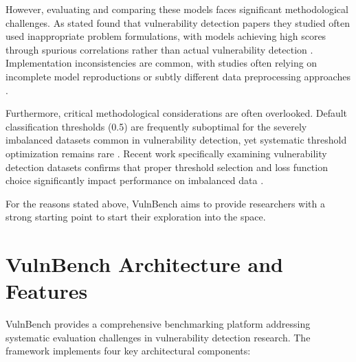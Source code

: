 \documentclass[letterpaper]{article}
\begin{document}
However, evaluating and comparing these models faces significant methodological challenges. As stated \cite{risse2025top} found that vulnerability detection papers they studied often used inappropriate problem formulations, with models achieving high scores through spurious correlations rather than actual vulnerability detection \citep{risse2025top}. Implementation inconsistencies are common, with studies often relying on incomplete model reproductions or subtly different data preprocessing approaches \citep{codecse2024}.

Furthermore, critical methodological considerations are often overlooked. Default classification thresholds (0.5) are frequently suboptimal for the severely imbalanced datasets common in vulnerability detection, yet systematic threshold optimization remains rare \citep{ghost2021, leevy2023optimal}. Recent work specifically examining vulnerability detection datasets confirms that proper threshold selection and loss function choice significantly impact performance on imbalanced data \citep{he2025imbalance}.

For the reasons stated above, VulnBench aims to provide researchers with a strong starting point to start their exploration into the space.

\section{VulnBench Architecture and Features}

VulnBench provides a comprehensive benchmarking platform addressing systematic evaluation challenges in vulnerability detection research. The framework implements four key architectural components:
\end{document}
